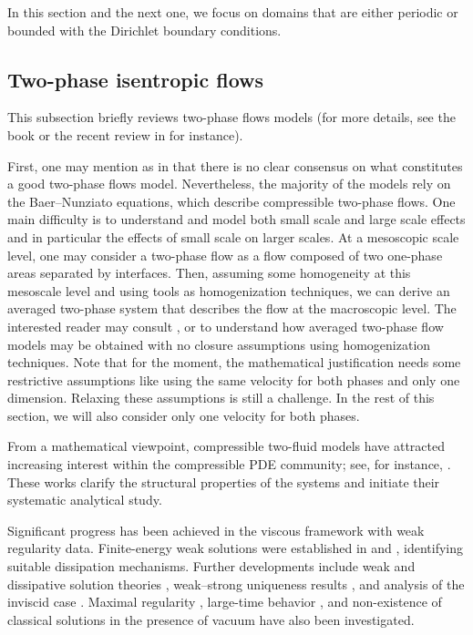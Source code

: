 \documentclass[11pt, twoside, a4paper]{article}
\theoremstyle{plain}
\theoremstyle{remark}
\numberwithin{equation}{section}
\begin{document}
In this section and the next one, we focus on domains that are either periodic or bounded with the Dirichlet boundary conditions.

\subsection{Two-phase isentropic flows}\label{subE}

This subsection briefly reviews two-phase flows models (for more details, see the book \cite{ishii2010thermo} or the recent review in \cite{bresch2024mathematical} for instance).

First, one may mention as in \cite{gavrilyuk2020uncertainty} that there is no clear consensus on what constitutes a good two-phase flows model. Nevertheless, the majority of the models rely on the Baer–Nunziato equations, which describe compressible two-phase flows. One main difficulty is to understand and model both small scale and large scale effects and in particular the effects of small scale on larger scales. At a mesoscopic scale level, one may consider a two-phase flow as a flow composed of two one-phase areas separated by interfaces. Then, assuming some homogeneity at this mesoscale level and using tools as homogenization techniques, we can derive an averaged two-phase system that describes the flow at the macroscopic level. The interested reader may consult \cite{bresch2015note}, \cite{bresch2022mathematical} or \cite{bresch2023mathematical} to understand how averaged two-phase flow models may be obtained with no closure assumptions using homogenization techniques. Note that for the moment, the mathematical justification needs some restrictive assumptions like using the same velocity for both phases and only one dimension. Relaxing these assumptions is still a challenge. In the rest of this section, we will also consider only one velocity for both phases.

From a mathematical viewpoint, compressible two-fluid models have attracted increasing interest within the compressible PDE community; see, for instance, \cite{bresch2018multi}. These works clarify the structural properties of the systems and initiate their systematic analytical study.

Significant progress has been achieved in the viscous framework with weak regularity data. Finite-energy weak solutions were established in \cite{bresch2019finite} and \cite{vasseur2019global}, identifying suitable dissipation mechanisms. Further developments include weak and dissipative solution theories \cite{novotny2020weak,novotny2020weak1,jin2021existence}, weak–strong uniqueness results \cite{jin2019weak,li2021remarks,li2026weak}, and analysis of the inviscid case \cite{li2021weak}. Maximal regularity \cite{piasecki2022maximal}, large-time behavior \cite{li2020large}, and non-existence of classical solutions in the presence of vacuum \cite{li2025non} have also been investigated.
\end{document}
